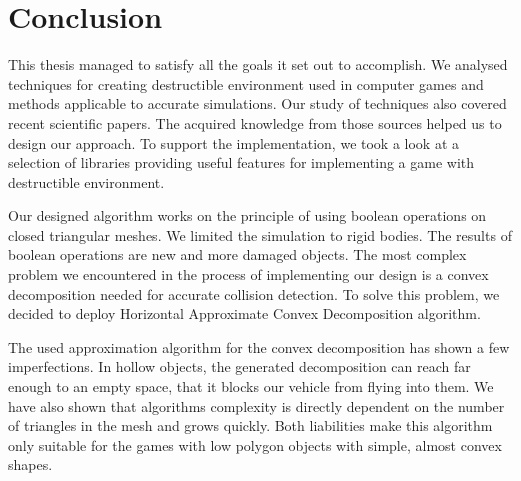 \chapter*{Conclusion}

This thesis managed to satisfy all the goals it set out to accomplish. We analysed techniques for creating destructible environment used in computer games and methods applicable to accurate simulations. Our study of techniques also covered recent scientific papers. The acquired knowledge from those sources helped us to design our approach. To support the implementation, we took a look at a selection of libraries providing useful features for implementing a game with destructible environment.

Our designed algorithm works on the principle of using boolean operations on closed triangular meshes. We limited the simulation to rigid bodies. The results of boolean operations are new and more damaged objects. The most complex problem we encountered in the process of implementing our design is a convex decomposition needed for accurate collision detection. To solve this problem, we decided to deploy Horizontal Approximate Convex Decomposition algorithm.

The used approximation algorithm for the convex decomposition has shown a few imperfections. In hollow objects, the generated decomposition can reach far enough to an empty space, that it blocks our vehicle from flying into them. We have also shown that algorithms complexity is directly dependent on the number of triangles in the mesh and grows quickly. Both liabilities make this algorithm only suitable for the games with low polygon objects with simple, almost convex shapes.


